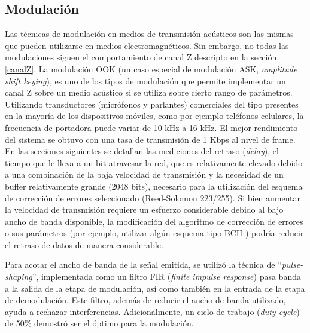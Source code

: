 \subsection{Modulación}
Las técnicas de modulación en medios de transmisión acústicos son las mismas que pueden utilizarse en medios electromagnéticos.
Sin embargo, no todas las modulaciones siguen el comportamiento de canal Z descripto en la sección \ref{canalZ}.
La modulación OOK (un caso especial de modulación ASK, \textit{amplitude shift keying}), es uno de los tipos de modulación que permite implementar un canal Z sobre un medio acústico si se utiliza sobre cierto rango de parámetros. Utilizando transductores (micrófonos y parlantes) comerciales del tipo presentes en la mayoría de los dispositivos móviles, como por ejemplo teléfonos celulares, la frecuencia de portadora puede variar de 10 kHz a 16 kHz. El mejor rendimiento del sistema se obtuvo con una tasa de transmisión de 1 Kbps al nivel de frame. En las secciones siguientes se detallan las mediciones del retraso (\textit{delay}), el tiempo que le lleva a un bit atravesar la red, que es relativamente elevado debido a una combinación de la baja velocidad de transmisión y la necesidad de un buffer relativamente grande (2048 bits), necesario para la utilización del esquema de corrección de errores seleccionado (Reed-Solomon 223/255). Si bien aumentar la velocidad de transmisión requiere un esfuerzo considerable debido al bajo ancho de banda disponible, la modificación del algoritmo de corrección de errores o sus parámetros (por ejemplo, utilizar algún esquema tipo BCH \cite{bose1960class}) podría reducir el retraso de datos de manera considerable.

Para acotar el ancho de banda de la señal emitida, se utilizó la técnica de ``\textit{pulse-shaping}'', implementada como un filtro FIR \cite{oppenheim1989discrete} (\textit{finite impulse response}) pasa banda a la salida de la etapa de modulación, así como también en la entrada de la etapa de demodulación. Este filtro, además de reducir el ancho de banda utilizado, ayuda a rechazar interferencias.
Adicionalmente, un ciclo de trabajo (\textit{duty cycle}) de 50\% demostró ser el óptimo para la modulación.

